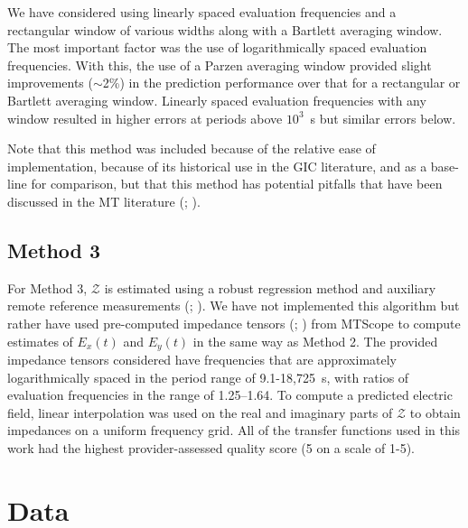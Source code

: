 \documentclass[linenumbers,draft]{agujournal}
\begin{document}
We have considered using linearly spaced evaluation frequencies and a rectangular window of various widths along with a Bartlett averaging window.  The most important factor was the use of logarithmically spaced evaluation frequencies.  With this, the use of a Parzen averaging window provided slight improvements ($\sim$2\%) in the prediction performance over that for a rectangular or Bartlett averaging window.  Linearly spaced evaluation frequencies with any window resulted in higher errors at periods above $10^3$~s but similar errors below.  

Note that this method was included because of the relative ease of implementation, because of its historical use in the GIC literature, and as a base-line for comparison, but that this method has potential pitfalls that have been discussed in the MT literature (\cite{Egbert1986}; \cite{Eisel2001}).

\subsection{Method 3}

For Method 3, $\mathcal{Z}$ is estimated using a robust regression method and auxiliary remote reference measurements (\cite{Egbert1986}; \cite{Eisel2001}).  We have not implemented this algorithm but rather have used pre-computed impedance tensors (\cite{Kelbert2011}; \cite{Schultz2016}) from MTScope to compute estimates of $E_x(t)$ and $E_y(t)$ in the same way as Method 2.  The provided impedance tensors considered have frequencies that are approximately logarithmically spaced in the period range of 9.1-18,725~s, with ratios of evaluation frequencies in the range of 1.25--1.64.  To compute a predicted electric field, linear interpolation was used on the real and imaginary parts of $\mathcal{Z}$ to obtain impedances on a uniform frequency grid.  All of the transfer functions used in this work had the highest provider-assessed quality score (5 on a scale of 1-5).

\section{Data}
\end{document}
